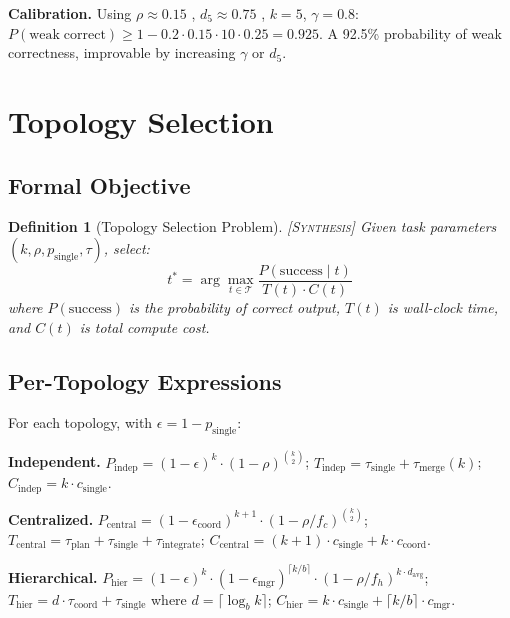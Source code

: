 \documentclass[11pt, a4paper, logo, copyright]{googledeepmind}
\newtheorem{definition}{Definition}[section]
\newcommand{\synthesis}{\textsc{[Synthesis]}}
\begin{document}
\textbf{Calibration.}
Using $\rho \approx 0.15$ \citep{KasiSarma2013}, $d_5 \approx 0.75$ \citep{Sousa2018}, $k = 5$, $\gamma = 0.8$:
$P(\mathrm{weak\;correct}) \geq 1 - 0.2 \cdot 0.15 \cdot 10 \cdot 0.25 = 0.925$.
A 92.5\% probability of weak correctness, improvable by increasing $\gamma$ or $d_5$.


\section{Topology Selection}
\label{sec:topology}

\subsection{Formal Objective}

\begin{definition}[Topology Selection Problem] \synthesis{}
Given task parameters $(k, \rho, p_{\mathrm{single}}, \tau)$, select:
\begin{equation}
\label{eq:topology-obj}
  t^* = \arg\max_{t \in \mathcal{T}} \frac{P(\mathrm{success} \mid t)}{T(t) \cdot C(t)}
\end{equation}
where $P(\mathrm{success})$ is the probability of correct output, $T(t)$ is wall-clock time, and $C(t)$ is total compute cost.
\end{definition}

\subsection{Per-Topology Expressions}

For each topology, with $\epsilon = 1 - p_{\mathrm{single}}$:

\medskip
\noindent\textbf{Independent.}
$P_{\mathrm{indep}} = (1-\epsilon)^k \cdot (1-\rho)^{\binom{k}{2}}$;
$T_{\mathrm{indep}} = \tau_{\mathrm{single}} + \tau_{\mathrm{merge}}(k)$;
$C_{\mathrm{indep}} = k \cdot c_{\mathrm{single}}$.

\medskip
\noindent\textbf{Centralized.}
$P_{\mathrm{central}} = (1-\epsilon_{\mathrm{coord}})^{k+1} \cdot (1-\rho/f_c)^{\binom{k}{2}}$;
$T_{\mathrm{central}} = \tau_{\mathrm{plan}} + \tau_{\mathrm{single}} + \tau_{\mathrm{integrate}}$;
$C_{\mathrm{central}} = (k+1) \cdot c_{\mathrm{single}} + k \cdot c_{\mathrm{coord}}$.

\medskip
\noindent\textbf{Hierarchical.}
$P_{\mathrm{hier}} = (1-\epsilon)^k \cdot (1-\epsilon_{\mathrm{mgr}})^{\lceil k/b \rceil} \cdot (1-\rho/f_h)^{k \cdot d_{\mathrm{avg}}}$;
$T_{\mathrm{hier}} = d \cdot \tau_{\mathrm{coord}} + \tau_{\mathrm{single}}$ where $d = \lceil \log_b k \rceil$;
$C_{\mathrm{hier}} = k \cdot c_{\mathrm{single}} + \lceil k/b \rceil \cdot c_{\mathrm{mgr}}$.
\end{document}
